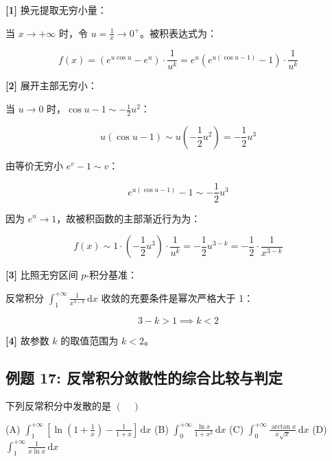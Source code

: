 \documentclass[11pt,a4paper,UTF8]{ctexart}
\begin{document}
\begin{solbox}[分步推导与答题规范]
\textbf{[1]} 换元提取无穷小量：

当 $x \to +\infty$ 时，令 $u = \frac{1}{x} \to 0^+$。被积表达式为：


\begin{equation*}
f(x) = \left( e^{u\cos u} - e^u \right) \cdot \frac{1}{u^k} = e^u \left( e^{u(\cos u - 1)} - 1 \right) \cdot \frac{1}{u^k}
\end{equation*}


\textbf{[2]} 展开主部无穷小：

当 $u \to 0$ 时，$\cos u - 1 \sim -\frac{1}{2}u^2$：


\begin{equation*}
u(\cos u - 1) \sim u\left(-\frac{1}{2}u^2\right) = -\frac{1}{2}u^3
\end{equation*}


由等价无穷小 $e^v - 1 \sim v$：


\begin{equation*}
e^{u(\cos u - 1)} - 1 \sim -\frac{1}{2}u^3
\end{equation*}


因为 $e^u \to 1$，故被积函数的主部渐近行为为：


\begin{equation*}
f(x) \sim 1 \cdot \left(-\frac{1}{2}u^3\right) \cdot \frac{1}{u^k} = -\frac{1}{2} u^{3-k} = -\frac{1}{2} \cdot \frac{1}{x^{3-k}}
\end{equation*}


\textbf{[3]} 比照无穷区间 $p$-积分基准：

反常积分 $\int_1^{+\infty} \frac{1}{x^{3-k}}\,\mathrm{d}x$ 收敛的充要条件是幂次严格大于 1：


\begin{equation*}
3 - k > 1 \implies k < 2
\end{equation*}


\textbf{[4]} 故参数 $k$ 的取值范围为 $k < 2$。
\end{solbox}


\subsection{例题 17: 反常积分敛散性的综合比较与判定}

下列反常积分中发散的是 $(\quad)$

(A) $\int_1^{+\infty} \left[ \ln\left(1 + \frac{1}{x}\right) - \frac{1}{1+x} \right]\,\mathrm{d}x$
(B) $\int_0^{+\infty} \frac{\ln x}{1+x^2}\,\mathrm{d}x$
(C) $\int_0^{+\infty} \frac{\arctan x}{x\sqrt{x}}\,\mathrm{d}x$
(D) $\int_1^{+\infty} \frac{1}{x\ln x}\,\mathrm{d}x$
\end{document}
